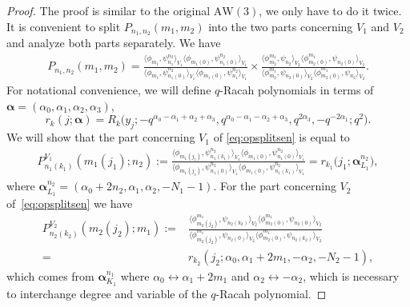 \documentclass[10pt,a4paper]{amsart}
\numberwithin{equation}{section}
\newcommand{\aw}{\mathrm{AW}\!\left(3\right)}
\begin{document}
\begin{proof}
	The proof is similar to the original $\aw$, we only have to do it twice. It is convenient to split $P_{n_1,n_2}(m_1,m_2)$ into the two parts concerning $V_1$ and $V_2$ and analyze both parts separately. We have
	\begin{gather}
		P_{n_1,n_2}(m_1,m_2) = \frac{\big\langle \phi_{m_1},\psi_{n_1}^{n_2}\big\rangle _{V_1}\big\langle \phi_{m_1(0)},\psi_{n_1(0)}^{n_2}\big\rangle _{V_1}}{\big\langle \phi_{m_1},\psi_{n_1(0)}^{n_2}\big\rangle _{V_1}\big\langle \phi_{m_1(0)},\psi_{n_1}^{n_2}\big\rangle _{V_1}} \times\frac{\big\langle \phi_{m_2}^{m_1}, \psi_{n_2}\big\rangle _{ V_2}\big\langle \phi_{m_2(0)}^{m_1}, \psi_{n_2(0)}\big\rangle _{ V_2}}{\big\langle \phi_{m_2}^{m_1}, \psi_{n_2(0)}\big\rangle _{ V_2}\big\langle \phi_{m_2(0)}^{m_1}, \psi_{n_2}\big\rangle _{ V_2}}.\label{eq:opsplitsen}
	\end{gather}
	For notational convenience, we will define $q$-Racah polynomials in terms of $\bm{\alpha}=(\alpha_0,\alpha_1,\alpha_2,\alpha_3)$,
	\[
	r_{k}(j;\bm{\alpha})=R_k\big(y_j;-q^{\alpha_0-\alpha_1+\alpha_2+\alpha_3},q^{\alpha_0-\alpha_1-\alpha_2+\alpha_3},q^{2\alpha_3},-q^{-2\alpha_1};q^2\big).
	\]
	We will show that the part concerning $V_1$ of \eqref{eq:opsplitsen} is equal to
	\begin{gather}
P_{n_1(k_1)}^{V_1}(m_1(j_1);n_2):=\frac{\big\langle \phi_{m_1(j_1)},\psi_{n_1(k_1)}^{n_2}\big\rangle _{V_1}\big\langle \phi_{m_1(0)},\psi_{n_1(0)}^{n_2}\big\rangle _{V_1}}{\big\langle \phi_{m_1(j_1)},\psi_{n_1(0)}^{n_2}\big\rangle _{V_1}\big\langle \phi_{m_1(0)},\psi_{n_1(k_1)}^{n_2}\big\rangle _{V_1}} = r_{k_1}\big(j_1;\bm{\alpha}_{L_1}^{n_2}\big),\label{eq:polracah1}
	\end{gather}
	where $\bm{\alpha}_{L_1}^{n_2}=(\alpha_0+2n_2,\alpha_1,\alpha_2,-N_1-1)$.
	For the part concerning $V_2$ of~\eqref{eq:opsplitsen} we have
	\begin{align}
P_{n_2(k_2)}^{V_2}(m_2(j_2);m_1):={}&\frac{\big\langle \phi_{m_2(j_2)}^{m_1},\psi_{n_2(k_2)}\big\rangle _{ V_2}\big\langle \phi_{m_2(0)}^{m_1}, \psi_{n_2(0)}\big\rangle _{ V_2}}{\big\langle \phi_{m_2(j_2)}^{m_1}, \psi_{n_2(0)}\big\rangle _{ V_2}\big\langle \phi_{m_2(0)}^{m_1}, \psi_{n_2(k_2)}\big\rangle _{ V_2}}\nonumber\\
={} &r_{k_2}(j_2;\alpha_0,\alpha_1+2m_1,-\alpha_2,-N_2-1), \label{eq:polracah2}
	\end{align}
	which comes from $\bm{\alpha}_{K_1}^{n_1}$ where $\alpha_0 \leftrightarrow \alpha_1+2m_1$ and $\alpha_2\leftrightarrow -\alpha_2$, which is necessary to interchange degree and variable of the $q$-Racah polynomial.
	

\end{proof}
\end{document}
